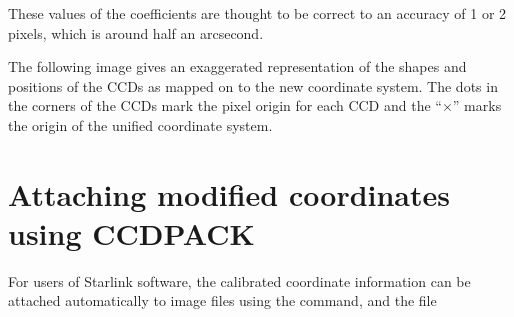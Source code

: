 \documentclass[11pt]{article}
\begin{document}
These values of the coefficients are thought to be correct to an
accuracy of 1 or 2 pixels, which is around half an arcsecond.

The following image gives an exaggerated representation of the 
shapes and positions of the CCDs as mapped on to the new coordinate system.
The dots in the corners of the CCDs mark the pixel origin for each CCD
and the ``$\times$'' marks the origin of the unified coordinate system.
\begin{quote}
\begin{center}
\end{center}
\end{quote}


\latexhtml{\newpage}{\htmlrule}
\section{Attaching modified coordinates using CCDPACK}

For users of Starlink software,
the calibrated coordinate information can be attached automatically
to image files using the 
command, and the file 
\end{document}
